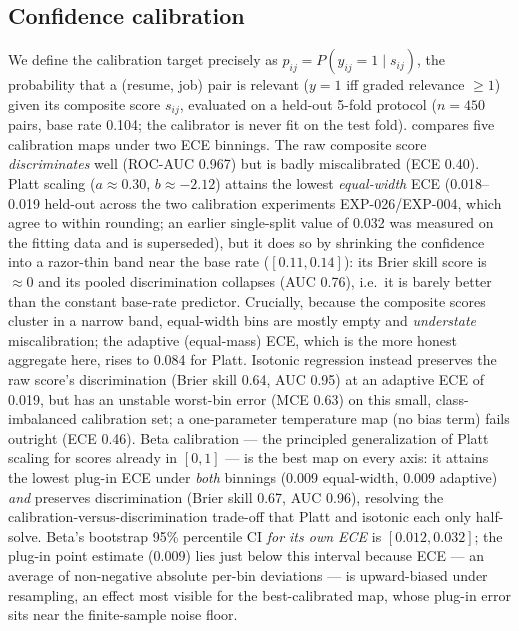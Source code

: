 \subsection{Confidence calibration}\label{sec:5.3}
We define the calibration target precisely as $p_{ij} = P(y_{ij}{=}1 \mid s_{ij})$, the probability that a (resume, job) pair is relevant ($y{=}1$ iff graded relevance $\geq 1$) given its composite score $s_{ij}$, evaluated on a held-out 5-fold protocol ($n = 450$ pairs, base rate 0.104; the calibrator is never fit on the test fold).
 compares five calibration maps under two ECE binnings.
The raw composite score \emph{discriminates} well (ROC-AUC 0.967) but is badly miscalibrated (ECE 0.40).
Platt scaling ($a \approx 0.30$, $b \approx -2.12$) attains the lowest \emph{equal-width} ECE (0.018--0.019 held-out across the two calibration experiments EXP-026/EXP-004, which agree to within rounding; an earlier single-split value of 0.032 was measured on the fitting data and is superseded), but it does so by shrinking the confidence into a razor-thin band near the base rate ($[0.11, 0.14]$): its Brier skill score is $\approx 0$ and its pooled discrimination collapses (AUC 0.76), i.e.\ it is barely better than the constant base-rate predictor. Crucially, because the composite scores cluster in a narrow band, equal-width bins are mostly empty and \emph{understate} miscalibration; the adaptive (equal-mass) ECE, which is the more honest aggregate here, rises to 0.084 for Platt.
Isotonic regression instead preserves the raw score's discrimination (Brier skill 0.64, AUC 0.95) at an adaptive ECE of 0.019, but has an unstable worst-bin error (MCE 0.63) on this small, class-imbalanced calibration set; a one-parameter temperature map (no bias term) fails outright (ECE 0.46).
Beta calibration \citep{kull2017beta} --- the principled generalization of Platt scaling for scores already in $[0,1]$ --- is the best map on every axis: it attains the lowest plug-in ECE under \emph{both} binnings (0.009 equal-width, 0.009 adaptive) \emph{and} preserves discrimination (Brier skill 0.67, AUC 0.96), resolving the calibration-versus-discrimination trade-off that Platt and isotonic each only half-solve. Beta's bootstrap 95\% percentile CI \emph{for its own ECE} is $[0.012, 0.032]$; the plug-in point estimate (0.009) lies just below this interval because ECE --- an average of non-negative absolute per-bin deviations --- is upward-biased under resampling, an effect most visible for the best-calibrated map, whose plug-in error sits near the finite-sample noise floor.
